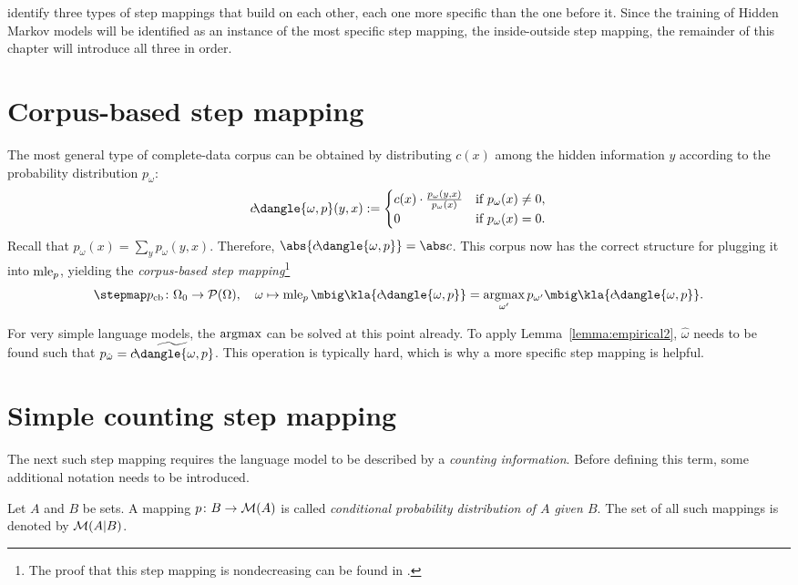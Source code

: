 \cite{bucstuvog15} identify three types of step mappings that build on each
other, each one more specific than the one before it. Since the training of
Hidden Markov models will be identified as an instance of the most specific
step mapping, the inside-outside step mapping, the remainder of this chapter
will introduce all three in order.

\section{Corpus-based step mapping}

The most general type of complete-data corpus can be obtained by distributing
$c(x)$ among the hidden information $y$ according to the probability
distribution $p_\omega$:
\[
 c\!\dangle{\omega,p}(y,x) := \begin{cases}
  c(x) \cdot \frac{p_\omega(y,x)}{p_\omega(x)} & \text{if } p_\omega(x) \neq 0, \\
  0 & \text{if } p_\omega(x) = 0.
 \end{cases}
\]
Recall that $p_\omega(x) = \sum_y p_\omega(y,x)$. Therefore,
$\abs{c\!\dangle{\omega,p}} = \abs c$. This corpus now has the correct
structure for plugging it into $\operatorname{mle}_p$, yielding the \emph{corpus-based step
mapping}\footnote{The proof that this step mapping is nondecreasing can be
found in \cite[pp.~10]{bucstuvog15}.}
\[
 \stepmap p_\mathrm{cb}\colon \Omega_0\to\up(\Omega),
 \quad
 \omega \mapsto \mle_p\mbig\kla{c\!\dangle{\omega,p}} = \argmax_{\omega'} p_{\omega'}\mbig\kla{c\!\dangle{\omega,p}}.
\]

For very simple language models, the $\argmax$ can be solved at this point
already. To apply Lemma~\ref{lemma:empirical2}, $\hat\omega$ needs to be found
such that $p_{\hat\omega} = \widetilde{c\!\dangle{\omega,p}}$. This operation
is typically hard, which is why a more specific step mapping is helpful.

\section{Simple counting step mapping}

The next such step mapping requires the language model to be described by a
\emph{counting information}. Before defining this term, some additional
notation needs to be introduced.

\begin{definition}\label{def:02-cpd}
 Let $A$ and $B$ be sets. A mapping $p\colon B \to \mathcal M(A)$ is called
 \emph{conditional probability distribution of $A$ given $B$}. The set of all
 such mappings is denoted by $\mathcal M(A|B)$.
\end{definition}

